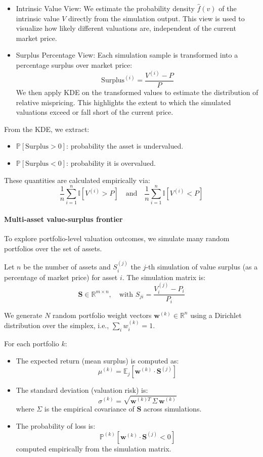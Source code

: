 \begin{itemize}
  \item Intrinsic Value View:
  We estimate the probability density $\hat{f}(v)$ of the intrinsic value $V$ directly from the simulation output. This view is used to visualize how likely different valuations are, independent of the current market price.

  \item Surplus Percentage View:
  Each simulation sample is transformed into a percentage surplus over market price:
  \[
  \text{Surplus}^{(i)} = \frac{V^{(i)} - P}{P}
  \]
  We then apply KDE on the transformed values to estimate the distribution of relative mispricing. This highlights the extent to which the simulated valuations exceed or fall short of the current price.
\end{itemize}

From the KDE, we extract:
\begin{itemize}
  \item $\mathbb{P}[\text{Surplus} > 0]$: probability the asset is undervalued.
  \item $\mathbb{P}[\text{Surplus} < 0]$: probability it is overvalued.
\end{itemize}

These quantities are calculated empirically via:
\[
\frac{1}{n} \sum_{i=1}^n \mathbb{I}[V^{(i)} > P]
\quad \text{and} \quad
\frac{1}{n} \sum_{i=1}^n \mathbb{I}[V^{(i)} < P]
\]

\paragraph{Multi-asset value-surplus frontier}

To explore portfolio-level valuation outcomes, we simulate many random portfolios over the set of assets.

Let $n$ be the number of assets and $S^{(j)}_i$ the $j$-th simulation of value surplus (as a percentage of market price) for asset $i$. The simulation matrix is:
\[
\mathbf{S} \in \mathbb{R}^{m \times n}, \quad \text{with } S_{ji} = \frac{V^{(j)}_i - P_i}{P_i}
\]

We generate $N$ random portfolio weight vectors $\mathbf{w}^{(k)} \in \mathbb{R}^n$ using a Dirichlet distribution over the simplex, i.e., $\sum_i w^{(k)}_i = 1$.

For each portfolio $k$:
\begin{itemize}
  \item The expected return (mean surplus) is computed as:
  \[
  \mu^{(k)} = \mathbb{E}_{j}[\mathbf{w}^{(k)} \cdot \mathbf{S}^{(j)}]
  \]

  \item The standard deviation (valuation risk) is:
  \[
  \sigma^{(k)} = \sqrt{ \mathbf{w}^{(k)T} \, \Sigma \, \mathbf{w}^{(k)} }
  \]
  where $\Sigma$ is the empirical covariance of $\mathbf{S}$ across simulations.

  \item The probability of loss is:
  \[
  \mathbb{P}^{(k)}[ \mathbf{w}^{(k)} \cdot \mathbf{S}^{(j)} < 0 ]
  \]
  computed empirically from the simulation matrix.
\end{itemize}

